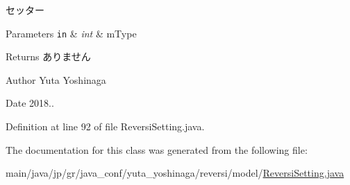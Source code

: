 セッター 


\begin{DoxyParams}[1]{Parameters}
\mbox{\tt in}  & {\em int} & m\+Type \\
\hline
\end{DoxyParams}
\begin{DoxyReturn}{Returns}
ありません 
\end{DoxyReturn}
\begin{DoxyAuthor}{Author}
Yuta Yoshinaga 
\end{DoxyAuthor}
\begin{DoxyDate}{Date}
2018.. 
\end{DoxyDate}


Definition at line 92 of file Reversi\+Setting.\+java.



The documentation for this class was generated from the following file\+:\begin{DoxyCompactItemize}
\item 
main/java/jp/gr/java\+\_\+conf/yuta\+\_\+yoshinaga/reversi/model/\hyperlink{_reversi_setting_8java}{Reversi\+Setting.\+java}\end{DoxyCompactItemize}
